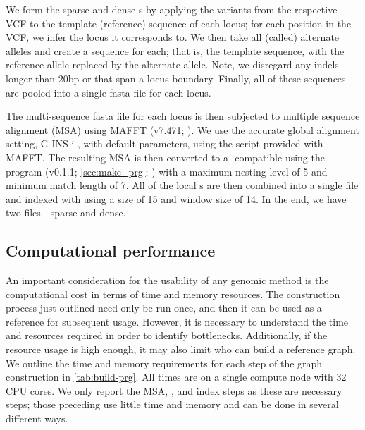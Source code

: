 We form the sparse and dense \panrg{}s by applying the variants from the respective VCF to the template (reference) sequence of each locus; for each position in the VCF, we infer the locus it corresponds to. We then take all (called) alternate alleles and create a sequence for each; that is, the template sequence, with the reference allele replaced by the alternate allele. Note, we disregard any indels longer than 20bp or that span a locus boundary. Finally, all of these sequences are pooled into a single fasta file for each locus. 

The multi-sequence fasta file for each locus is then subjected to multiple sequence alignment (MSA) using MAFFT (v7.471; \cite{nakamura2018}). We use the accurate global alignment setting, G-INS-i \cite{katoh2016}, with default parameters, using the  script provided with MAFFT. The resulting MSA is then converted to a \pandora{}-compatible \prg{} using the \makeprg{} program (v0.1.1; \autoref{sec:make_prg}; \cite{pandora}) with a maximum nesting level of 5 and minimum match length of 7. All of the local \prg{}s are then combined into a single \panrg{} file and indexed with \pandora{} using a \kmer{} size of 15 and window size of 14. In the end, we have two \panrg{} files - sparse and dense.

\subsection{Computational performance}
\label{sec:tbprg-comp-perf}

An important consideration for the usability of any genomic method is the computational cost in terms of time and memory resources. The construction process just outlined need only be run once, and then it can be used as a reference for subsequent \pandora{} usage. However, it is necessary to understand the time and resources required in order to identify bottlenecks. Additionally, if the resource usage is high enough, it may also limit who can build a reference graph. We outline the time and memory requirements for each step of the graph construction in \autoref{tab:build-prg}. All times are on a single compute node with 32 CPU cores. We only report the MSA, \makeprg{}, and \pandora{} index steps as these are necessary steps; those preceding use little time and memory and can be done in several different ways.

